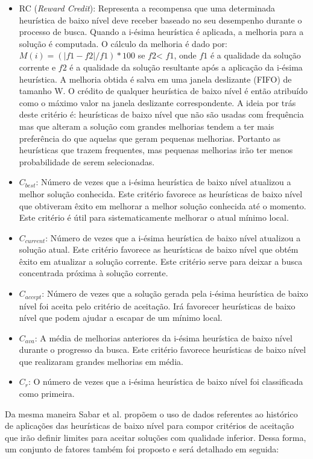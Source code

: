 \begin{itemize}
	\item RC (\textit{Reward Credit}): Representa a recompensa que uma determinada heurística de baixo nível deve receber baseado no seu desempenho durante o processo de busca. Quando a i-ésima heurística é aplicada, a melhoria para a solução é computada. O cálculo da melhoria é dado por: $M(i) = (|f1 -f2|/f1) *100$ se $f2$< $f1$, onde $f1$ é a qualidade da solução corrente e $f2$ é a qualidade da solução resultante após a aplicação da i-ésima heurística. 
	A melhoria obtida é salva em uma janela deslizante (FIFO) de tamanho W. O crédito de qualquer heurística de baixo nível é então atribuído como o máximo valor na janela deslizante correspondente. A ideia por trás deste critério é: heurísticas de baixo nível que não são usadas com frequência mas que alteram a solução com grandes melhorias tendem a ter mais preferência do que aquelas que geram pequenas melhorias. Portanto as heurísticas que trazem frequentes, mas pequenas melhorias irão ter menos probabilidade de serem selecionadas.
	\item $C_{best}$: Número de vezes que a i-ésima heurística de baixo nível atualizou a melhor solução conhecida. Este critério favorece as heurísticas de baixo nível que obtiveram êxito em melhorar a melhor solução conhecida até o momento. Este critério é útil para sistematicamente melhorar o atual mínimo local.
	\item $C_{current}$: Número de vezes que a i-ésima heurística de baixo nível atualizou a solução atual. Este critério favorece as heurísticas de baixo nível que obtém êxito em atualizar a solução corrente. Este critério serve para deixar a busca concentrada próxima à solução corrente.
	\item $C_{accept}$: Número de vezes que a solução gerada pela i-ésima heurística de baixo nível foi aceita pelo critério de aceitação. Irá favorecer heurísticas de baixo nível que podem ajudar a escapar de um mínimo local.
	\item $C_{ava}$: A média de melhorias anteriores da i-ésima heurística de baixo nível durante o progresso da busca. Este critério favorece heurísticas de baixo nível que realizaram grandes melhorias em média.
	\item $C_r$: O número de vezes que a i-ésima heurística de baixo nível foi classificada como primeira.  
\end{itemize} 

Da mesma maneira Sabar et al. \cite{sabar2015automatic} propõem o uso de dados referentes ao histórico de aplicações das heurísticas de baixo nível para compor critérios de aceitação que irão definir limites para aceitar soluções com qualidade inferior. Dessa forma, um conjunto de fatores também foi proposto e será detalhado em seguida:


